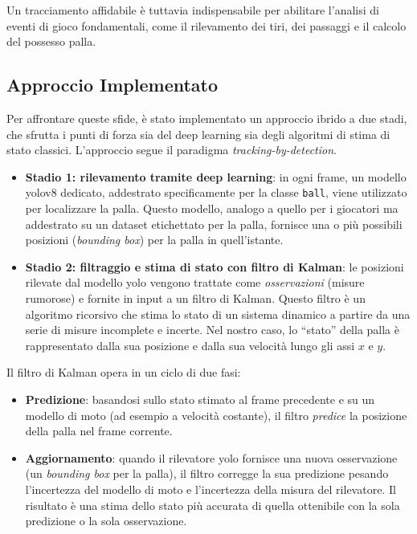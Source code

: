 \documentclass[12pt,a4paper,openright,twoside]{book}
\begin{document}
Un tracciamento affidabile è tuttavia indispensabile per abilitare l'analisi di eventi di gioco fondamentali, come il rilevamento dei tiri, 
dei passaggi e il calcolo del possesso palla.

\subsection{Approccio Implementato}
\label{subsec:approccio-implementato-palla}

Per affrontare queste sfide, è stato implementato un approccio ibrido a due stadi, che sfrutta i punti di forza sia del deep learning
sia degli algoritmi di stima di stato classici. L'approccio segue il paradigma \emph{tracking-by-detection}.

\begin{itemize}
  \item \textbf{Stadio 1: rilevamento tramite deep learning}: in ogni frame, un modello \ac{yolo}v8 dedicato, addestrato specificamente per la 
  classe \texttt{ball}, viene utilizzato per localizzare la palla. Questo modello, analogo a quello per i giocatori ma addestrato su un dataset 
  etichettato per la palla, fornisce una o più possibili posizioni (\emph{bounding box}) per la palla in quell'istante.
  \item \textbf{Stadio 2: filtraggio e stima di stato con filtro di Kalman}: le posizioni rilevate dal modello \ac{yolo} vengono trattate come 
  \emph{osservazioni} (misure rumorose) e fornite in input a un filtro di Kalman. Questo filtro è un algoritmo ricorsivo che stima lo stato 
  di un sistema dinamico a partire da una serie di misure incomplete e incerte. Nel nostro caso, lo ``stato'' della palla è 
  rappresentato dalla sua posizione e dalla sua velocità lungo gli assi $x$ e $y$.
\end{itemize}

Il filtro di Kalman opera in un ciclo di due fasi:

\begin{itemize}
  \item \textbf{Predizione}: basandosi sullo stato stimato al frame precedente e su un modello di moto (ad esempio a velocità costante), 
  il filtro \emph{predice} la posizione della palla nel frame corrente.
  \item \textbf{Aggiornamento}: quando il rilevatore \ac{yolo} fornisce una nuova osservazione (un \emph{bounding box} per la palla), 
  il filtro corregge la sua predizione pesando l'incertezza del modello di moto e l'incertezza della misura del rilevatore. 
  Il risultato è una stima dello stato più accurata di quella ottenibile con la sola predizione o la sola osservazione.
\end{itemize}
\end{document}
